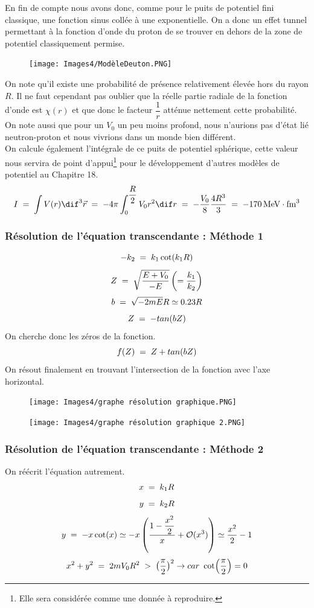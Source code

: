 En fin de compte nous avons donc, comme pour le puits de potentiel fini classique, une fonction sinus collée à une exponentielle. On a donc un effet tunnel permettant à la fonction d'onde du proton de se trouver en dehors de la zone de potentiel classiquement permise.
\begin{figure}[H]
    \centering
    \texttt{[image: Images4/ModèleDeuton.PNG]}
\end{figure}
On note qu'il existe une probabilité de présence relativement élevée hors du rayon $R$. Il ne faut cependant pas oublier que la réelle partie radiale de la fonction d'onde est $\chi(r)$ et que donc le facteur $\dfrac{1}{r}$ atténue nettement cette probabilité.\\
On note aussi que pour un $V_0$ un peu moins profond, nous n'aurions pas d'état lié neutron-proton et nous vivrions dans un monde bien différent.\\

On calcule également l'intégrale de ce puits de potentiel sphérique, cette valeur nous servira de point d'appui\footnote{Elle sera considérée comme une donnée à reproduire.} pour le développement d'autres modèles de potentiel au Chapitre 18.
\[
    I 
    \eq \int V(r) \dif^3\vec{r} 
    \eq -4\pi\int_0^{\dfrac{R}{2}} V_0 r^2 \dif r 
    \eq -\dfrac{V_0}{8}\dfrac{4R^3}{3}
    \eq \SI{-170}{MeV \cdot fm^3}
\]
\subsubsection{Résolution de l'équation transcendante : Méthode 1}
\[
    -k_2 \; = \; k_1 \cot(k_1R)
\]
\[
    Z \; = \; \sqrt{\dfrac{E+V_0}{-E}} \left(= \dfrac{k_1}{k_2} \right)
\]
\[
    b \; = \; \sqrt{-2mE}R \simeq 0.23 R
\]
\[
    Z \; = \; -tan(bZ)
\]
On cherche donc les zéros de la fonction. 
\[
    f(Z) \; = \; Z + tan(bZ)
\]
On résout finalement en trouvant l'intersection de la fonction avec l'axe horizontal.
\begin{figure}[H]
    \centering
    \texttt{[image: Images4/graphe résolution graphique.PNG]}
\end{figure}
\begin{figure}[H]
    \centering
    \texttt{[image: Images4/graphe résolution graphique 2.PNG]}
\end{figure}
\subsubsection{Résolution de l'équation transcendante : Méthode 2}
On réécrit l'équation autrement.
\[
    x \; = \; k_1R
\]
\[
    y \; = \; k_2 R
\]
\[
    y \; = \; -x \cot(x) \simeq -x \left( \dfrac{1-\dfrac{x^2}{2}}{x} + \mathcal{O}(x^3) \right) \simeq \dfrac{x^2}{2} -1
\]
\[
    x^2 + y^2 \eq 2mV_0R^2 \; > \; \big(\dfrac{\pi}{2}\big)^2 \rightarrow car\ \cot(\dfrac{\pi}{2}) = 0
\]

